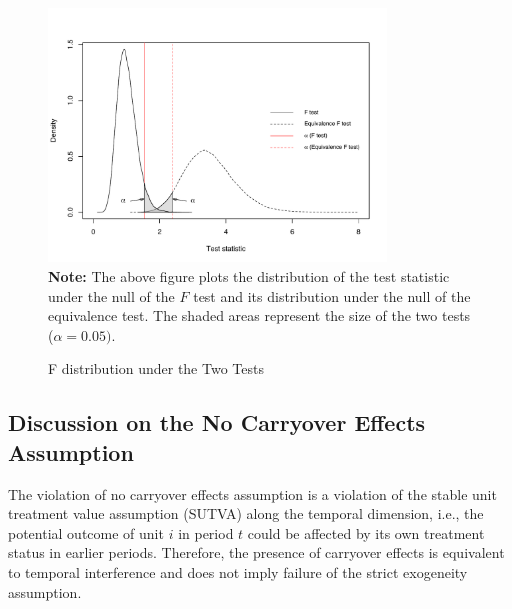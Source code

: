 \documentclass[12pt]{article}
\let\oldcenter\center
\let\oldendcenter\endcenter
\renewenvironment{center}{\setlength\topsep{0pt}\oldcenter}{\oldendcenter}
\begin{document}
\begin{figure}[!th]
\caption{F distribution under the Two Tests}\label{fg:fvse}
\centering
\begin{minipage}{0.85\linewidth}{
\begin{center}
\includegraphics[trim=0 1em 0 4em,clip,width = 0.8\textwidth]{F_Distribution.pdf}\\
\end{center}
}
\footnotesize\textbf{Note:} The above figure plots the distribution of the test statistic under the null of the $F$ test and its distribution under the null of the equivalence test. The shaded areas represent the size of the two tests ($\alpha = 0.05)$. 
\end{minipage}
\end{figure}

\bigskip
\clearpage

\subsection{Discussion on the No Carryover Effects Assumption}\label{sc:no-co}

The violation of no carryover effects assumption is a violation of the stable unit treatment value assumption (SUTVA) along the temporal dimension, i.e., the potential outcome of unit $i$ in period $t$ could be affected by its own treatment status in earlier periods. Therefore, the presence of carryover effects is equivalent to temporal interference and does not imply failure of the strict exogeneity assumption. 
\end{document}

